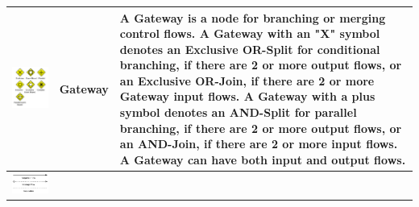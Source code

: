 \documentclass{article}
\begin{document}
\begin{longtable}{ | c | m{5cm} | m{5cm} | }
\begin{minipage}{.3\textwidth}
      \includegraphics[width=\linewidth]{gateaway}
    \end{minipage}
    &
    Gateway
    &
    A Gateway is a node for branching or merging control flows. A Gateway with an "X" symbol denotes an Exclusive OR-Split for conditional branching, if there are 2 or more output flows, or an Exclusive OR-Join, if there are 2 or more Gateway input flows. A Gateway with a plus symbol denotes an AND-Split for parallel branching, if there are 2 or more output flows, or an AND-Join, if there are 2 or more input flows. A Gateway can have both input and output flows.
 \\ \hline
 \begin{minipage}{.3\textwidth}
      \includegraphics[width=\linewidth]{sequence_flow}

\end{minipage}
\end{longtable}
\end{document}
